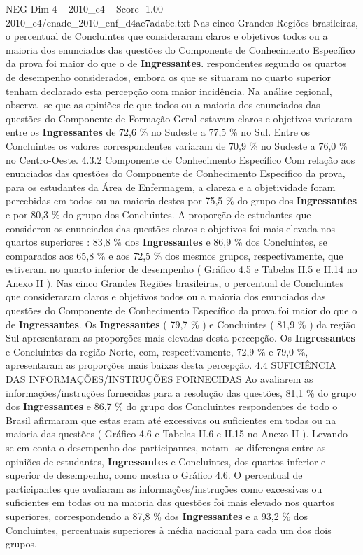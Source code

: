 \begin{textsample}{NEG Dim 4 – 2010\_c4 – Score -1.00 – 2010\_c4/enade\_2010\_enf\_d4ae7ada6c.txt}
Nas cinco Grandes Regiões brasileiras, o percentual de Concluintes que consideraram claros e objetivos todos ou a maioria dos enunciados das questões do Componente de Conhecimento Específico da prova foi maior do que o de \textbf{Ingressantes}. respondentes segundo os quartos de desempenho considerados, embora os que se situaram no quarto superior tenham declarado esta percepção com maior incidência.
Na análise regional, observa -se que as opiniões de que todos ou a maioria dos enunciados das questões do Componente de Formação Geral estavam claros e objetivos variaram entre os \textbf{Ingressantes} de 72,6 \% no Sudeste a 77,5 \% no Sul.
Entre os Concluintes os valores correspondentes variaram de 70,9 \% no Sudeste a 76,0 \% no Centro-Oeste. 4.3.2 Componente de Conhecimento Específico Com relação aos enunciados das questões do Componente de Conhecimento Específico da prova, para os estudantes da Área de Enfermagem, a clareza e a objetividade foram percebidas em todos ou na maioria destes por 75,5 \% do grupo dos \textbf{Ingressantes} e por 80,3 \% do grupo dos Concluintes.
A proporção de estudantes que considerou os enunciados das questões claros e objetivos foi mais elevada nos quartos superiores : 83,8 \% dos \textbf{Ingressantes} e 86,9 \% dos Concluintes, se comparados aos 65,8 \% e aos 72,5 \% dos mesmos grupos, respectivamente, que estiveram no quarto inferior de desempenho ( Gráfico 4.5 e Tabelas II.5 e II.14 no Anexo II ).
Nas cinco Grandes Regiões brasileiras, o percentual de Concluintes que consideraram claros e objetivos todos ou a maioria dos enunciados das questões do Componente de Conhecimento Específico da prova foi maior do que o de \textbf{Ingressantes}.
Os \textbf{Ingressantes} ( 79,7 \% ) e Concluintes ( 81,9 \% ) da região Sul apresentaram as proporções mais elevadas desta percepção.
Os \textbf{Ingressantes} e Concluintes da região Norte, com, respectivamente, 72,9 \% e 79,0 \%, apresentaram as proporções mais baixas desta percepção. 4.4 SUFICIÊNCIA DAS INFORMAÇÕES/INSTRUÇÕES FORNECIDAS Ao avaliarem as informações/instruções fornecidas para a resolução das questões, 81,1 \% do grupo dos \textbf{Ingressantes} e 86,7 \% do grupo dos Concluintes respondentes de todo o Brasil afirmaram que estas eram até excessivas ou suficientes em todas ou na maioria das questões ( Gráfico 4.6 e Tabelas II.6 e II.15 no Anexo II ).
Levando -se em conta o desempenho dos participantes, notam -se diferenças entre as opiniões de estudantes, \textbf{Ingressantes} e Concluintes, dos quartos inferior e superior de desempenho, como mostra o Gráfico 4.6.
O percentual de participantes que avaliaram as informações/instruções como excessivas ou suficientes em todas ou na maioria das questões foi mais elevado nos quartos superiores, correspondendo a 87,8 \% dos \textbf{Ingressantes} e a 93,2 \% dos Concluintes, percentuais superiores à média nacional para cada um dos dois grupos.

\end{textsample}
